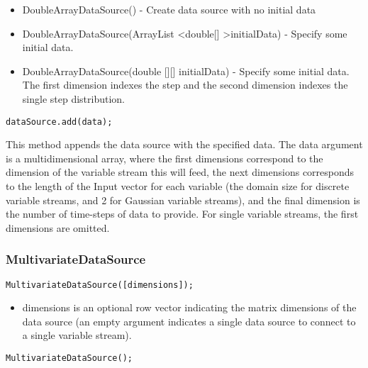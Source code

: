 \ifjava
\begin{itemize}
\item DoubleArrayDataSource() - Create data source with no initial data
\item DoubleArrayDataSource(ArrayList \textless double[] \textgreater  initialData) - Specify some initial data. 
\item DoubleArrayDataSource(double [][] initialData) - Specify some initial data.  The first dimension indexes the step and the second dimension indexes the single step distribution.
\end{itemize}
\fi



\begin{lstlisting}
dataSource.add(data);
\end{lstlisting}

This method appends the data source with the specified data.  The data argument is a multidimensional array, where the first dimensions correspond to the dimension of the variable stream this will feed, the next dimensions corresponds to the length of the Input vector for each variable (the domain size for discrete variable streams, and 2 for Gaussian variable streams), and the final dimension is the number of time-steps of data to provide.  For single variable streams, the first dimensions are omitted.

\subsubsection{MultivariateDataSource}


\ifmatlab
\begin{lstlisting}
MultivariateDataSource([dimensions]);
\end{lstlisting}

\begin{itemize}
\item dimensions is an optional row vector indicating the matrix dimensions of the data source (an empty argument indicates a single data source to connect to a single variable stream).
\end{itemize}
\fi

\ifjava
\begin{lstlisting}
MultivariateDataSource();
\end{lstlisting}
\fi


